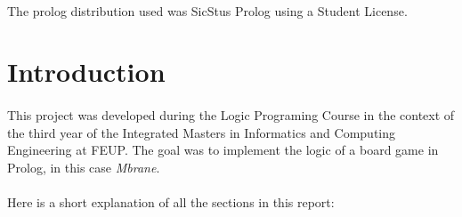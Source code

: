 \documentclass[a4paper]{article}
\begin{document}
\paragraph{}
The prolog distribution used was SicStus Prolog using a Student License.

\newpage

\tableofcontents



\newpage

\section{Introduction}
\paragraph{}
This project was developed during the Logic Programing Course in the context of the third year of the Integrated Masters in Informatics 
and Computing Engineering at FEUP. The goal was to implement the logic of a board game in Prolog, in this case \textit{Mbrane}.

\paragraph{}
Here is a short explanation of all the sections in this report:
\end{document}
